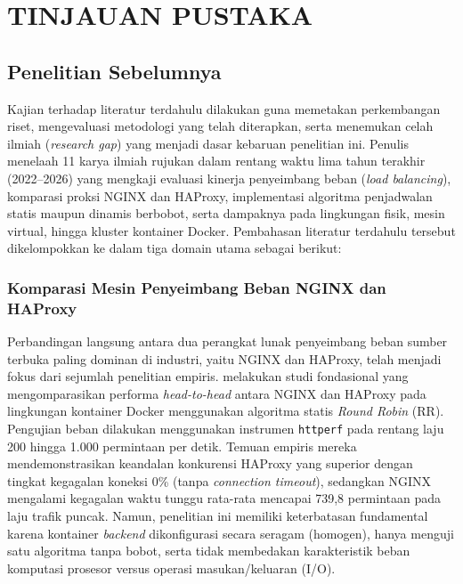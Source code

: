 
\chapter{TINJAUAN PUSTAKA}

\section{Penelitian Sebelumnya}
Kajian terhadap literatur terdahulu dilakukan guna memetakan perkembangan riset, mengevaluasi metodologi yang telah diterapkan, serta menemukan celah ilmiah (\textit{research gap}) yang menjadi dasar kebaruan penelitian ini. Penulis menelaah 11 karya ilmiah rujukan dalam rentang waktu lima tahun terakhir (2022--2026) yang mengkaji evaluasi kinerja penyeimbang beban (\textit{load balancing}), komparasi proksi NGINX dan HAProxy, implementasi algoritma penjadwalan statis maupun dinamis berbobot, serta dampaknya pada lingkungan fisik, mesin virtual, hingga kluster kontainer Docker. Pembahasan literatur terdahulu tersebut dikelompokkan ke dalam tiga domain utama sebagai berikut:

\subsection[Komparasi Mesin Penyeimbang Beban\\NGINX dan HAProxy]{Komparasi Mesin Penyeimbang Beban NGINX dan HAProxy}
Perbandingan langsung antara dua perangkat lunak penyeimbang beban sumber terbuka paling dominan di industri, yaitu NGINX dan HAProxy, telah menjadi fokus dari sejumlah penelitian empiris. \citet{nurzaman2022analisis} melakukan studi fondasional yang mengomparasikan performa \textit{head-to-head} antara NGINX dan HAProxy pada lingkungan kontainer Docker menggunakan algoritma statis \textit{Round Robin} (RR). Pengujian beban dilakukan menggunakan instrumen \texttt{httperf} pada rentang laju 200 hingga 1.000 permintaan per detik. Temuan empiris mereka mendemonstrasikan keandalan konkurensi HAProxy yang superior dengan tingkat kegagalan koneksi 0\% (tanpa \textit{connection timeout}), sedangkan NGINX mengalami kegagalan waktu tunggu rata-rata mencapai 739,8 permintaan pada laju trafik puncak. Namun, penelitian ini memiliki keterbatasan fundamental karena kontainer \textit{backend} dikonfigurasi secara seragam (homogen), hanya menguji satu algoritma tanpa bobot, serta tidak membedakan karakteristik beban komputasi prosesor versus operasi masukan/keluaran (I/O).

